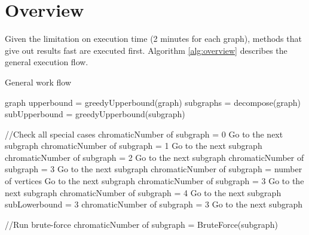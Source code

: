 \documentclass[a4paper]{report}
\begin{document}
	\section{Overview}
	Given the limitation on execution time (2 minutes for each graph), methods that give out results fast are executed first. Algorithm \ref{alg:overview} describes the general execution flow.\\
	\begin{algorithm}
		\caption{General work flow}
		\label{alg:overview}
		\begin{algorithmic}[1]
			\REQUIRE graph
			\STATE upperbound = greedyUpperbound(graph)
			\STATE subgraphs = decompose(graph)
				\STATE subUpperbound =  greedyUpperbound(subgraph)
				
				\STATE//Check all special cases
					\STATE chromaticNumber of subgraph = 0
					\STATE Go to the next subgraph
				\ENDIF
				\STATE chromaticNumber of subgraph = 1
				\STATE Go to the next subgraph
				\ENDIF
				\STATE chromaticNumber of subgraph = 2
				\STATE Go to the next subgraph
				\ENDIF
				\STATE chromaticNumber of subgraph = 3
				\STATE Go to the next subgraph
				\ENDIF
				\STATE chromaticNumber of subgraph = number of vertices
				\STATE Go to the next subgraph
				\ENDIF
					\STATE chromaticNumber of subgraph = 3
					\STATE Go to the next subgraph
					\ELSE
					\STATE chromaticNumber of subgraph = 4
					\STATE Go to the next subgraph
					\ENDIF
				\ENDIF
				\STATE subLowerbound = 3
				\STATE chromaticNumber of subgraph = 3
				\STATE Go to the next subgraph
				\ENDIF
				
				\STATE//Run brute-force
				\STATE chromaticNumber of subgraph = BruteForce(subgraph)
				\ENDIF 
			\ENDFOR

			\end{algorithmic}
		\end{algorithm}
\end{document}
